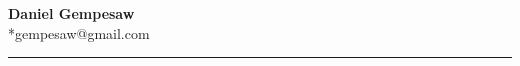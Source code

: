 \newcommand{\myauthor}[2] {
  \begin{center}
    \Large
    \textbf{#1}
    \normalsize
    \\*#2
    \vspace{0.125cm}
    \hrule
    \vspace{-0.625cm}
  \end{center}
}
%
\myauthor{Daniel Gempesaw}
         {gempesaw@gmail.com}
